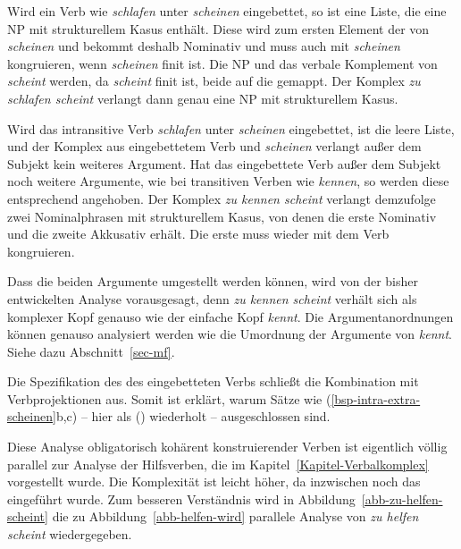 {Wird ein Verb wie \emph{schlafen} unter \emph{scheinen} eingebettet, so ist
 eine Liste, die eine NP mit strukturellem Kasus enthält. Diese wird
zum ersten Element der \argstl von \emph{scheinen} und bekommt
deshalb Nominativ und muss auch mit \emph{scheinen} kongruieren,
wenn \emph{scheinen} finit ist. Die NP und das verbale Komplement von \emph{scheint} werden, da
\emph{scheint} finit ist, beide auf die \compsl gemappt. Der Komplex \emph{zu schlafen scheint}
verlangt dann genau eine NP mit strukturellem Kasus.

Wird das intransitive Verb \emph{schlafen} unter \emph{scheinen} eingebettet,
ist  die leere Liste, und der Komplex aus eingebettetem Verb und \emph{scheinen}
verlangt außer dem Subjekt kein weiteres Argument. Hat das eingebettete Verb 
außer dem Subjekt noch weitere Argumente, wie \zb bei transitiven Verben wie \emph{kennen},
so werden diese entsprechend angehoben. Der Komplex \emph{zu kennen scheint} verlangt
demzufolge zwei Nominalphrasen mit strukturellem Kasus, von denen die erste Nominativ
und die zweite Akkusativ erhält. Die erste muss wieder mit dem Verb kongruieren.

Dass die beiden Argumente umgestellt werden können, wird von der bisher entwickelten
Analyse vorausgesagt, denn \emph{zu kennen scheint} verhält sich als komplexer Kopf
genauso wie der einfache Kopf \emph{kennt}. Die Argumentanordnungen können genauso
analysiert werden wie die Umordnung der Argumente von \emph{kennt}. Siehe dazu
Abschnitt~\ref{sec-mf}.

Die Spezifikation des \lexwes des eingebetteten Verbs schließt die Kombination
mit Verbprojektionen aus. Somit ist erklärt, warum Sätze wie (\ref{bsp-intra-extra-scheinen}b,c) -- hier
als () wiederholt -- ausgeschlossen sind.
\eal
{}
\zl
\largerpage

\noindent
Diese Analyse obligatorisch kohärent konstruierender Verben ist eigentlich völlig parallel
zur Analyse der Hilfsverben, die im Kapitel~\ref{Kapitel-Verbalkomplex} vorgestellt wurde. Die Komplexität
ist leicht höher, da inzwischen noch das \subjm eingeführt wurde. Zum besseren Verständnis
wird in Abbildung~\vref{abb-zu-helfen-scheint} die zu Abbildung~\vref{abb-helfen-wird} parallele Analyse von \emph{zu helfen scheint}
wiedergegeben.

}
